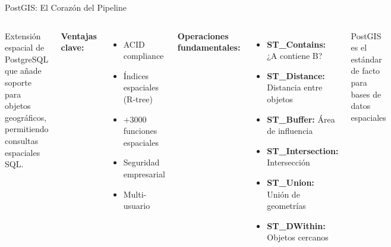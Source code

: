 \documentclass[10pt,aspectratio=169]{beamer}
\newcommand{\conceptbox}[2]{
\begin{tcolorbox}[colframe=usachblue,colback=blue!5,title=#1,fonttitle=\bfseries]
#2
\end{tcolorbox}
}
\newcommand{\alertbox}[1]{
\begin{tcolorbox}[colframe=red!70,colback=red!5]
\centering\faExclamationTriangle\space #1
\end{tcolorbox}
}
\begin{document}
\begin{frame}{PostGIS: El Corazón del Pipeline}
    \begin{columns}[T]
        \conceptbox{¿Qué es PostGIS?}{
            Extensión espacial de PostgreSQL que añade soporte para objetos geográficos, permitiendo consultas espaciales SQL.
        }
        
        \textbf{Ventajas clave:}
        \begin{itemize}
            \item \faDatabase\space ACID compliance
            \item \faSearch\space Índices espaciales (R-tree)
            \item \faTools\space +3000 funciones espaciales
            \item \faLock\space Seguridad empresarial
            \item \faUsers\space Multi-usuario
        \end{itemize}
        
        \textbf{Operaciones fundamentales:}
        \begin{itemize}
            \item \textbf{ST\_Contains:} ¿A contiene B?
            \item \textbf{ST\_Distance:} Distancia entre objetos
            \item \textbf{ST\_Buffer:} Área de influencia
            \item \textbf{ST\_Intersection:} Intersección
            \item \textbf{ST\_Union:} Unión de geometrías
            \item \textbf{ST\_DWithin:} Objetos cercanos
        \end{itemize}
        
        \vspace{0.3cm}
        \alertbox{PostGIS es el estándar de facto para bases de datos espaciales}
    \end{columns}
\end{frame}
\end{document}
